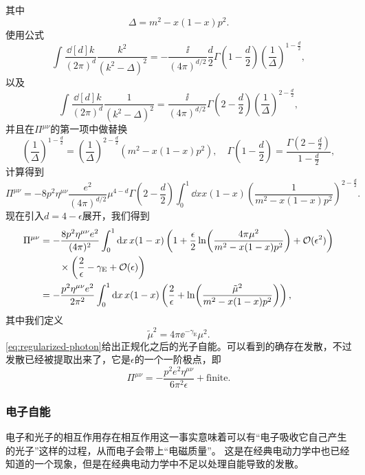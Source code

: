 其中
\[
    \Delta = m^2 - x(1-x) p^2.
\]
使用公式
\[
    \int \frac{\dd[d]{k}}{(2\pi)^d} \frac{k^2}{(k^2 - \Delta)^2} = - \frac{\ii}{(4\pi)^{d/2}} \frac{d}{2} \Gamma\left(1 - \frac{d}{2}\right) \left(\frac{1}{\Delta}\right)^{1-\frac{d}{2}},
\]
以及
\[
    \int \frac{\dd[d]{k}}{(2\pi)^d} \frac{1}{(k^2 - \Delta)^2} = \frac{\ii}{(4\pi)^{d/2}} \Gamma\left(2 - \frac{d}{2} \right) \left(\frac{1}{\Delta}\right)^{2-\frac{d}{2}},
\]
并且在$\Pi^{\mu \nu}$的第一项中做替换
\[
    \left(\frac{1}{\Delta}\right)^{1-\frac{d}{2}} = \left(\frac{1}{\Delta}\right)^{2-\frac{d}{2}} (m^2 - x(1-x) p^2), \quad \Gamma\left(1 - \frac{d}{2}\right) = \frac{\Gamma\left(2 - \frac{d}{2}\right)}{1 - \frac{d}{2}},
\]
计算得到
\[
    \Pi^{\mu \nu} = - 8 p^2 \eta^{\mu \nu} \frac{e^2}{(4\pi)^{d/2}} \mu^{4-d} \Gamma\left(2 - \frac{d}{2}\right) \int_0^1 \dd{x} x(1-x) \left(\frac{1}{m^2 - x(1-x) p^2}\right)^{2 - \frac{d}{2}}.
\]
现在引入$d = 4 - \epsilon$展开，我们得到
\begin{equation}
    \begin{aligned}
        \Pi^{\mu \nu} &= - \frac{8 p^2 \eta^{\mu \nu} e^2}{(4\pi)^2} \int_0^1 \dd{x} x(1-x) \left( 1 + \frac{\epsilon}{2} \ln(\frac{4 \pi \mu^2}{m^2 - x(1-x) p^2}) + \mathcal{O}{(}\epsilon^2) \right) \\
        &\quad \quad \times \left( \frac{2}{\epsilon} - \gamma_\text{E} + \mathcal{O}{(}\epsilon) \right) \\
        &= - \frac{p^2 \eta^{\mu \nu} e^2}{2 \pi^2} \int_0^1 \dd{x} x(1 - x) \left( \frac{2}{\epsilon} + \ln(\frac{\tilde{\mu}^2}{m^2 - x(1-x) p^2}) \right),
    \end{aligned}
    \label{eq:regularized-photon}
\end{equation}
其中我们定义
\begin{equation}
    \tilde{\mu}^2 = 4 \pi \ee^{-\gamma_\text{E}} \mu^2.
\end{equation}
\eqref{eq:regularized-photon}给出正规化之后的光子自能。可以看到的确存在发散，不过发散已经被提取出来了，它是$\epsilon$的一个一阶极点，即
\begin{equation}
    \Pi^{\mu \nu} = - \frac{p^2 e^2 \eta^{\mu \nu}}{6 \pi^2 \epsilon} + \text{finite}.
    \label{eq:photon-one-loop-divergence}
\end{equation}

\subsubsection{电子自能}

电子和光子的相互作用存在相互作用这一事实意味着可以有“电子吸收它自己产生的光子”这样的过程，从而电子会带上“电磁质量”。
这是在经典电动力学中也已经知道的一个现象，但是在经典电动力学中不足以处理自能导致的发散。

